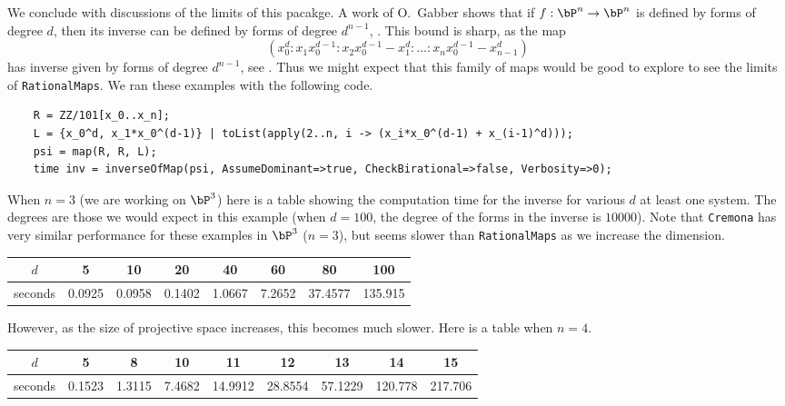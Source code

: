\documentclass[11pt]{amsart}%
\numberwithin{equation}{theorem}
\renewcommand{\:}{\colon}
\theoremstyle{theorem}
\begin{document}
{{%

We conclude with discussions of the limits of this pacakge.
A work of O.~Gabber shows that if $f : \bP^n \to \bP^n$ is defined by forms of degree $d$, then its inverse can be defined by forms of degree $d^{n-1}$, \cite{BassConnellWrightJacobianConjecture}.  This bound is sharp, as the map
    \[
        (x_0^d : x_1 x_0^{d-1} : x_2 x_0^{d-1} - x_1^d : \dots : x_n x_0^{d-1} - x_{n-1}^d)
    \]
    has inverse given by forms of degree $d^{n-1}$, see \cite{HassanzadehSimisBoundsOnDegreesOfBirat}.  Thus we might expect that this family of maps would be good to explore to see the limits of {\tt RationalMaps}.  We ran these examples with the following code.
}
{\scriptsize
\color{blue}
\begin{verbatim}
    R = ZZ/101[x_0..x_n];
    L = {x_0^d, x_1*x_0^(d-1)} | toList(apply(2..n, i -> (x_i*x_0^(d-1) + x_(i-1)^d)));
    psi = map(R, R, L);
    time inv = inverseOfMap(psi, AssumeDominant=>true, CheckBirational=>false, Verbosity=>0);
\end{verbatim}%
}%
{\color{black}\normalsize
When $n = 3$ (we are working on $\bP^3$) here is a table showing the computation time for the inverse for various $d$ at least one  system.  The degrees are those we would expect in this example (when $d = 100$, the degree of the forms in the inverse is $10000$).  Note that  {\tt Cremona} has very similar performance for these examples in $\bP^3$ ($n = 3$), but seems slower than {\tt RationalMaps} as we increase the dimension.
\begin{center}
\begin{tabular}{c|c|c|c|c|c|c|c}
  $d$ & 5 & 10 & 20 & 40 & 60 & 80 & 100 \\ \hline
  seconds  &  0.0925 &  0.0958 & 0.1402 &  1.0667 & 7.2652 &  37.4577 & 135.915 \\
\end{tabular}
\end{center}
However, as the size of projective space increases, this becomes much slower.  Here is a table when $n = 4$.
\begin{center}
  \begin{tabular}{c|c|c|c|c|c|c|c|c}
    $d$ & 5 & 8 & 10 & 11 & 12 & 13 & 14 & 15 \\ \hline
    seconds  &  0.1523 & 1.3115 &  7.4682 &  14.9912 &   28.8554 & 57.1229 &   120.778 &  217.706 \\
  \end{tabular}
\end{center}

}}
\end{document}
